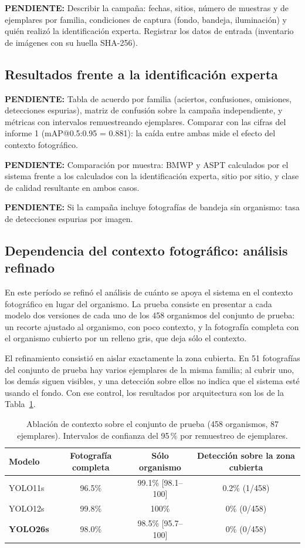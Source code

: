 \documentclass[onecolumn]{article}
\newcommand{\pendiente}[1]{\colorbox{yellow!40}{\parbox{0.95\linewidth}{\small\textbf{PENDIENTE:} #1}}}
\begin{document}
\pendiente{Describir la campaña: fechas, sitios, número de muestras y de ejemplares por familia, condiciones de captura (fondo, bandeja, iluminación) y quién realizó la identificación experta. Registrar los datos de entrada (inventario de imágenes con su huella SHA-256).}

\subsection{Resultados frente a la identificación experta}

\pendiente{Tabla de acuerdo por familia (aciertos, confusiones, omisiones, detecciones espurias), matriz de confusión sobre la campaña independiente, y métricas con intervalos remuestreando ejemplares. Comparar con las cifras del informe 1 (mAP@0.5:0.95 = 0.881): la caída entre ambas mide el efecto del contexto fotográfico.}

\pendiente{Comparación por muestra: BMWP y ASPT calculados por el sistema frente a los calculados con la identificación experta, sitio por sitio, y clase de calidad resultante en ambos casos.}

\pendiente{Si la campaña incluye fotografías de bandeja sin organismo: tasa de detecciones espurias por imagen.}

\subsection{Dependencia del contexto fotográfico: análisis refinado}

En este período se refinó el análisis de cuánto se apoya el sistema en el contexto fotográfico en lugar del organismo. La prueba consiste en presentar a cada modelo dos versiones de cada uno de los 458 organismos del conjunto de prueba: un recorte ajustado al organismo, con poco contexto, y la fotografía completa con el organismo cubierto por un relleno gris, que deja sólo el contexto.

El refinamiento consistió en aislar exactamente la zona cubierta. En 51 fotografías del conjunto de prueba hay varios ejemplares de la misma familia; al cubrir uno, los demás siguen visibles, y una detección sobre ellos no indica que el sistema esté usando el fondo. Con ese control, los resultados por arquitectura son los de la Tabla~\ref{tab:ablacion}.

\begin{table}[H]
\centering
\renewcommand{\arraystretch}{1.15}
\caption{Ablación de contexto sobre el conjunto de prueba (458 organismos, 87 ejemplares). Intervalos de confianza del 95\,\% por remuestreo de ejemplares.}
\label{tab:ablacion}
\begin{tabular}{lccc}
\hline
\textbf{Modelo} & \textbf{Fotografía completa} & \textbf{Sólo organismo} & \textbf{Detección sobre la zona cubierta} \\
\hline
YOLO11s & 96.5\% & 99.1\% [98.1--100] & 0.2\% (1/458) \\
YOLO12s & 99.8\% & 100\% & 0\% (0/458) \\
\textbf{YOLO26s} & 98.0\% & 98.5\% [95.7--100] & 0\% (0/458) \\
\hline
\end{tabular}
\end{table}
\end{document}

